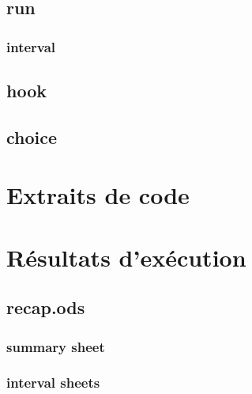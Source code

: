 \documentclass[a4paper,10pt]{report}
\begin{document}
\section{run}

\subsection{interval}

\section{hook}

\section{choice}

\chapter{Extraits de code}

\chapter{Résultats d'exécution}

\section{recap.ods}
\subsection{summary sheet}


\subsection{interval sheets}

\end{document}
